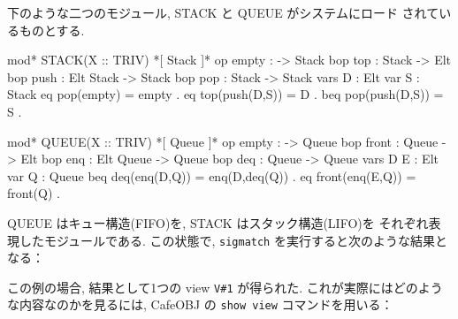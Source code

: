下のような二つのモジュール, STACK と QUEUE がシステムにロード
されているものとする.

\begin{vvtm}
\begin{simplev}
mod* STACK(X :: TRIV) {
  *[ Stack ]*
  op empty : -> Stack
  bop top : Stack -> Elt
  bop push : Elt Stack -> Stack
  bop pop : Stack -> Stack
  vars D : Elt   var S : Stack
  eq pop(empty) = empty .
  eq top(push(D,S)) = D .
  beq pop(push(D,S)) = S .
}

mod* QUEUE(X :: TRIV) {
  *[ Queue ]*
  op empty : -> Queue 
  bop front : Queue -> Elt
  bop enq : Elt Queue -> Queue
  bop deq : Queue -> Queue
  vars D E : Elt   var Q : Queue
  beq deq(enq(D,Q)) = enq(D,deq(Q)) .
  eq front(enq(E,Q)) = front(Q) .
}
\end{simplev}
\end{vvtm}
QUEUE はキュー構造(FIFO)を, STACK はスタック構造(LIFO)を
それぞれ表現したモジュールである. 
この状態で, \texttt{sigmatch} を実行すると次のような結果となる：

\begin{vvtm}
\end{vvtm}

この例の場合, 結果として1つの view \texttt{V\#1} が得られた.
これが実際にはどのような内容なのかを見るには, 
CafeOBJ の \texttt{show view}
コマンドを用いる：

\begin{vvtm}
\end{vvtm}

